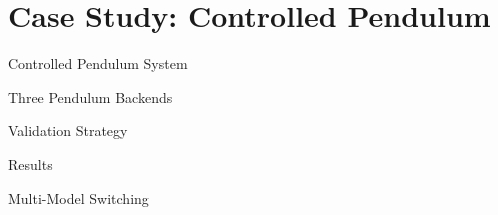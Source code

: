 
\section{Case Study: Controlled Pendulum}

\begin{frame}{Controlled Pendulum System}
\end{frame}

\begin{frame}{Three Pendulum Backends}
\end{frame}

\begin{frame}{Validation Strategy}
\end{frame}

\begin{frame}{Results}
\end{frame}

\begin{frame}{Multi-Model Switching}
\end{frame}
